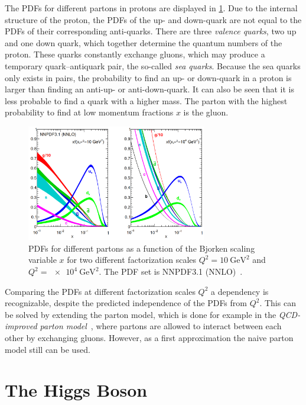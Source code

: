 The PDFs for different partons in protons are displayed in \cref{fig:theory:pdfs}.
Due to the internal structure of the proton, the PDFs of the up- and down-quark are not equal to the PDFs of their corresponding anti-quarks.
There are three \emph{valence quarks}, two up and one down quark, which together determine the quantum numbers of the proton.
These quarks constantly exchange gluons, which may produce a temporary quark--antiquark pair, the so-called \emph{sea quarks}.
Because the sea quarks only exists in pairs, the probability to find an up- or down-quark in a proton is larger than finding an
anti-up- or anti-down-quark.
It can also be seen that it is less probable to find a quark with a higher mass.
The parton with the highest probability to find at low momentum fractions $x$ is the gluon.

\begin{figure}[htb]
    \centering
    \includegraphics[width=0.7\textwidth]{./figures/theory/nnpdf.png}
    \caption{PDFs for different partons as a function of the Bjorken scaling variable $x$
             for two different factorization scales $Q^2 = \SI{10}{\GeV\squared}$ and $Q^2 = \SI{e4}{\GeV\squared}$.
             The PDF set is NNPDF3.1 (NNLO)~\cite{nnpdf3.1}.}\label{fig:theory:pdfs}
\end{figure}

Comparing the PDFs at different factorization scales $Q^2$ a dependency is recognizable,
despite the predicted independence of the PDFs from $Q^2$.
This can be solved by extending the parton model, which is done for example in the \emph{QCD-improved parton model}~\cite{col98}, where
partons are allowed to interact between each other by exchanging gluons.
However, as a first approximation the naive parton model still can be used.

\section{The Higgs Boson}\label{sec:theory:higgs}


